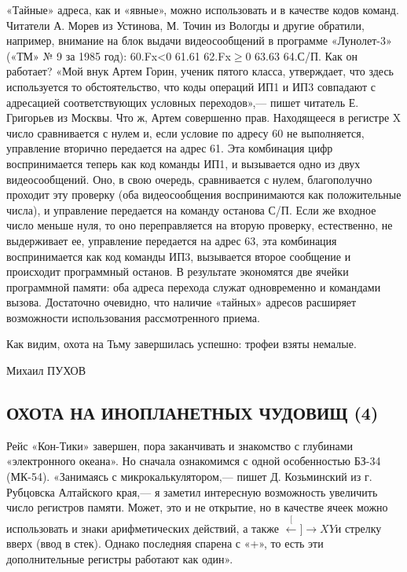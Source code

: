 \documentclass[11pt,a4paper,oneside]{article}
\def\XY{$\stackrel[\leftarrow]{\rightarrow}{XY}$}
\begin{document}
«Тайные» адреса, как и «явные», можно использовать и в качестве кодов команд. Читатели А. Морев из Устинова, М. Точин из Вологды и другие обратили, например, внимание на блок выдачи видеосообщений в программе «Лунолет-3» («ТМ» № 9 за 1985 год): 60.Fx<0 61.61 62.Fx$\geq$0 63.63 64.С/П. Как он работает? «Мой внук Артем Горин, ученик пятого класса, утверждает, что здесь используется то обстоятельство, что коды операций ИП1 и ИП3 совпадают с адресацией соответствующих условных переходов»,— пишет читатель Е. Григорьев из Москвы. Что ж, Артем совершенно прав. Находящееся в регистре X число сравнивается с нулем и, если условие по адресу 60 не выполняется, управление вторично передается на адрес 61. Эта комбинация цифр воспринимается теперь как код команды ИП1, и вызывается одно из двух видеосообщений. Оно, в свою очередь, сравнивается с нулем, благополучно проходит эту проверку (оба видеосообщения воспринимаются как положительные числа), и управление передается на команду останова С/П. Если же входное число меньше нуля, то оно переправляется на вторую проверку, естественно, не выдерживает ее, управление передается на адрес 63, эта комбинация воспринимается как код команды ИП3, вызывается второе сообщение и происходит программный останов. В результате экономятся две ячейки программной памяти: оба адреса перехода служат одновременно и командами вызова. Достаточно очевидно, что наличие «тайных» адресов расширяет возможности использования рассмотренного приема.

Как видим, охота на Тьму завершилась успешно: трофеи взяты немалые.

Михаил ПУХОВ

\subsection{ОХОТА НА ИНОПЛАНЕТНЫХ ЧУДОВИЩ (4)}
Рейс «Кон-Тики» завершен, пора заканчивать и знакомство с глубинами «электронного океана». Но сначала ознакомимся с одной особенностью БЗ-34 (МК-54). «Занимаясь с микрокалькулятором,— пишет Д. Козьминский из г. Рубцовска Алтайского края,— я заметил интересную возможность увеличить число регистров памяти. Может, это и не открытие, но в качестве ячеек можно использовать и знаки арифметических действий, а также \XY и стрелку вверх (ввод в стек). Однако последняя спарена с «+», то есть эти дополнительные регистры работают как один».
\end{document}

